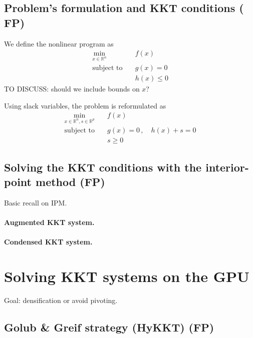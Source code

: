 \documentclass{article}
\theoremstyle{definition}
\theoremstyle{remark}
\begin{document}
\subsection{Problem's formulation and KKT conditions ( FP)}
We define the nonlinear program as
\begin{equation}
  \begin{aligned}
    \min_{x \in \mathbb{R}^n} \; & f(x) \\
    \text{subject to} \quad & g(x) = 0 \\
                            & h(x) \leq 0
  \end{aligned}
\end{equation}
TO DISCUSS: should we include bounds on $x$?

Using slack variables, the problem is reformulated as
\begin{equation}
  \begin{aligned}
    \min_{x \in \mathbb{R}^n, s \in \mathbb{R}^p} \; & f(x) \\
    \text{subject to} \quad & g(x) = 0 \, , \quad h(x) + s = 0  \\
                            & s \geq 0
  \end{aligned}
\end{equation}


\subsection{Solving the KKT conditions with the interior-point method (FP)}
Basic recall on IPM.

\paragraph{Augmented KKT system.}

\paragraph{Condensed KKT system.}



\section{Solving KKT systems on the GPU}
Goal: densification or avoid pivoting.
\subsection{Golub \& Greif strategy (HyKKT) (FP)}
\end{document}
